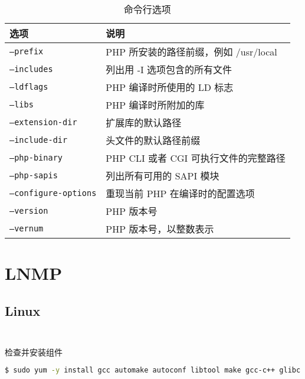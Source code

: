 \begin{table}[htbp]
\centering
\caption{命令行选项}
\begin{tabular}{|l|l|}
\hline
选项					&说明\\
\hline
\texttt{--prefix}			&PHP 所安装的路径前缀，例如 /usr/local\\
\hline
\texttt{--includes}		&列出用 -I 选项包含的所有文件\\
\hline
\texttt{--ldflags}			&PHP 编译时所使用的 LD 标志\\
\hline
\texttt{--libs}			&PHP 编译时所附加的库\\
\hline
\texttt{--extension-dir}	&扩展库的默认路径\\
\hline
\texttt{--include-dir}		&头文件的默认路径前缀\\
\hline
\texttt{--php-binary}		&PHP CLI 或者 CGI 可执行文件的完整路径\\
\hline
\texttt{--php-sapis}		&列出所有可用的 SAPI 模块\\
\hline
\texttt{--configure-options}	&重现当前 PHP 在编译时的配置选项\\
\hline
\texttt{--version}			&PHP 版本号\\
\hline
\texttt{--vernum}		&PHP 版本号，以整数表示\\
\hline
\end{tabular}
\end{table}



\chapter{LNMP}



\section{Linux}


\begin{lstlisting}[language=bash]

\end{lstlisting}




\begin{lstlisting}[language=bash]

\end{lstlisting}





检查并安装组件


\begin{lstlisting}[language=bash]
$ sudo yum -y install gcc automake autoconf libtool make gcc-c++ glibc
\end{lstlisting}

